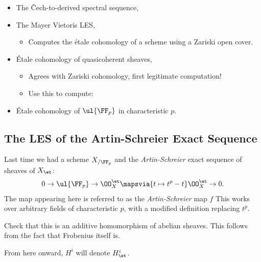 \begin{itemize}
\tightlist
\item
  The Čech-to-derived spectral sequence,
\item
  The Mayer Vietoris LES,

  \begin{itemize}
  \tightlist
  \item
    Computes the étale cohomology of a scheme using a Zariski open
    cover.
  \end{itemize}
\item
  Étale cohomology of quasicoherent sheaves,

  \begin{itemize}
  \tightlist
  \item
    Agrees with Zariski cohomology, first legitimate computation!
  \item
    Use this to compute:
  \end{itemize}
\item
  Étale cohomology of \(\ul{\FF_p}\) in characteristic \(p\).
\end{itemize}

\hypertarget{the-les-of-the-artin-schreier-exact-sequence}{%
\subsection{The LES of the Artin-Schreier Exact
Sequence}\label{the-les-of-the-artin-schreier-exact-sequence}}

Last time we had a scheme \(X_{/\FF_p}\) and the \emph{Artin-Schreier}
exact sequence of sheaves of \(X_\et\):
\begin{align*}  
0\to \ul{\FF_p} \to \OO_X^\et \mapsvia{t\mapsto t^p - t} \OO_X^\et \to 0
.\end{align*} The map appearing here is referred to as the
\emph{Artin-Schreier} map \(f\) This works over arbitrary fields of
characteristic \(p\), with a modified definition replacing \(t^p\).

\begin{exercise}[?]

Check that this is an additive homomorphism of abelian sheaves. This
follows from the fact that Frobenius itself is.

\end{exercise}

\begin{remark}

From here onward, \(H^i\) will denote \(H^i_\et\).

\end{remark}

